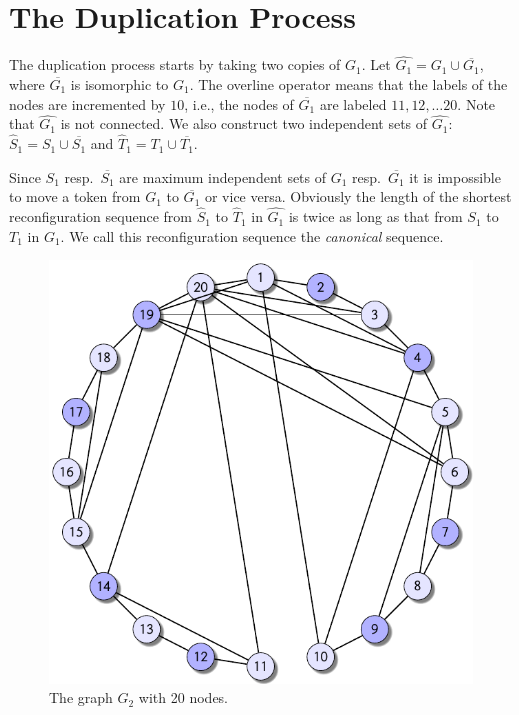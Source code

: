 \documentclass{article}
\begin{document}
\section{The Duplication Process}
The duplication process starts by taking two copies of $G_1$. Let
$\hat{G_1}=G_1 \cup \overline{G_1}$, where $\overline{G_1}$ is
isomorphic to $G_1$. The overline operator means that the labels of
the nodes are incremented by $10$, i.e., the nodes of $\overline{G_1}$
are labeled $11,12,\ldots 20$. Note that $\hat{G_1}$ is not
connected. We also construct two independent sets of $\hat{G_1}$:
$\hat{S}_1=S_1 \cup \overline{S_1}$ and
$\hat{T}_1=T_1 \cup \overline{T_1}$.

Since $S_1$ resp.\ $\overline{S_1}$ are maximum independent sets of
$G_1$ resp.\ $\overline{G_1}$ it is impossible to move a token from
$G_1$ to $\overline{G_1}$ or vice versa. Obviously the length of the
shortest reconfiguration sequence from $\hat{S}_1$ to $\hat{T}_1$ in
$\hat{G_1}$ is twice as long as that from $S_1$ to $T_1$ in $G_1$. We
call this reconfiguration sequence the {\em canonical} sequence.


\begin{figure}[ht]
  \centering
  \includegraphics{figures/graph_020.pdf}
  \caption{The graph $G_{2}$ with 20 nodes.}\label{fig:g2}
\end{figure}
\end{document}
